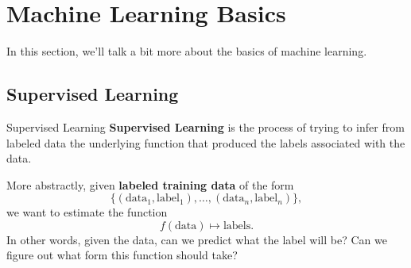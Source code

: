 \documentclass[letterpaper]{article}
\begin{document}
\newpage 
\section{Machine Learning Basics}
In this section, we'll talk a bit more about the basics of machine learning. 

\subsection{Supervised Learning}
\begin{definition}{Supervised Learning}{}
    \textbf{Supervised Learning} is the process of trying to infer from labeled data the underlying function that produced the labels associated with the data. 
\end{definition}
More abstractly, given \textbf{labeled training data} of the form 
\[\{(\text{data}_1, \text{label}_1), \ldots, (\text{data}_n, \text{label}_n)\},\]
we want to estimate the function 
\[f(\text{data}) \mapsto \text{labels}.\]
In other words, given the data, can we predict what the label will be? Can we figure out what form this function should take? 
\end{document}
